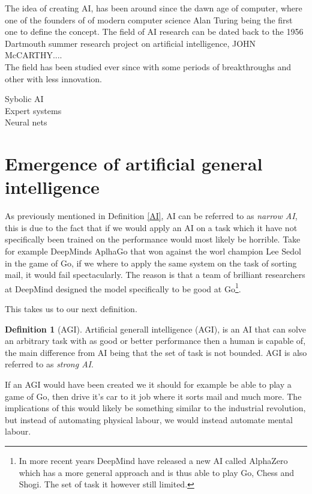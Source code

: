 \documentclass{report}
\theoremstyle{definition}
\newtheorem{definition}{Definition}[section]
\begin{document}
The idea of creating AI, has been around since the dawn age of computer, where one of the founders of of modern computer science Alan Turing being the first one to define the concept. The field of AI research can be dated back to the 1956 Dartmouth summer research project on artificial intelligence, JOHN McCARTHY.... \\

The field has been studied ever since with some periods of breakthroughs and other with less innovation. 

Sybolic AI\\

Expert systems\\

Neural nets\\

\section{Emergence of artificial general intelligence}

As previously mentioned in Definition \ref{AI}, AI can be referred to as \textit{narrow AI}, this is due to the fact that if we would apply an AI on a task which it have not specifically been trained on the performance would most likely be horrible. Take for example DeepMinds AplhaGo that won against the worl champion Lee Sedol in the game of Go, if we where to apply the same system on the task of sorting mail, it would fail spectacularly. The reason is that a team of brilliant researchers at DeepMind designed the model specifically to be good at Go\footnote{In more recent years DeepMind have released a new AI called AlphaZero which has a more general approach and is thus able to play Go, Chess and Shogi. The set of task it however still limited.}. 

This takes us to our next definition.
\begin{definition}[AGI]
    Artificial generall intelligence (AGI), is an AI that can solve an arbitrary task with as good or better performance then a human is capable of, the main difference from AI being that the set of task is not bounded. AGI is also referred to as \textit{strong AI}.
\end{definition}
If an AGI would have been created we it should for example be able to play a game of Go, then drive it's car to it job where it sorts mail and much more. The implications of this would likely be something similar to the industrial revolution, but instead of automating physical labour, we would instead automate mental labour. 
\end{document}
